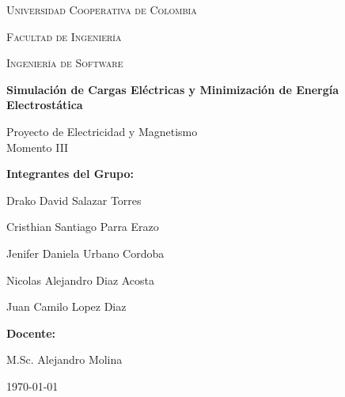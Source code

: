 
\begin{titlepage}
    \centering
    
    \vspace*{1cm}
    
    {\scshape\LARGE Universidad Cooperativa de Colombia \par}
    \vspace{0.5cm}
    {\scshape\Large Facultad de Ingeniería \par}
    \vspace{0.5cm}
    {\scshape\large Ingeniería de Software \par}
    
    \vspace{2cm}
    
    {\huge\bfseries Simulación de Cargas Eléctricas y Minimización de Energía Electrostática \par}
    
    \vspace{1cm}
    
    {\Large Proyecto de Electricidad y Magnetismo \\ Momento III \par}
    
    \vspace{2cm}
    
    \begin{minipage}{0.85\textwidth}
        \centering
        {\large \textbf{Integrantes del Grupo:} \par}
        \vspace{0.5cm}
        {\Large Drako David Salazar Torres \par}
        \vspace{0.2cm}
        {\Large Cristhian Santiago Parra Erazo \par}
        \vspace{0.2cm}
        {\Large Jenifer Daniela Urbano Cordoba \par}
        \vspace{0.2cm}
        {\Large Nicolas Alejandro Diaz Acosta \par}
        \vspace{0.2cm}
        {\Large Juan Camilo Lopez Diaz \par}
    \end{minipage}
    
    \vspace{1.5cm}
    
    {\large \textbf{Docente:} \par}
    \vspace{0.3cm}
    {\Large M.Sc. Alejandro Molina \par}
    
    \vfill
    
    {\large \today \par}
    
\end{titlepage}
